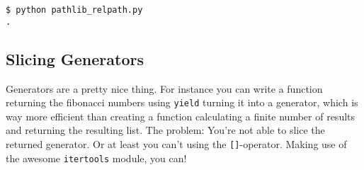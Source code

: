 \begin{lstlisting}[caption=Output of pathlib\_relpath.py]
$ python pathlib_relpath.py
.
\end{lstlisting}


\subsection{Slicing Generators}

Generators are a pretty nice thing.
For instance you can write a function returning the fibonacci numbers using \lstinline{yield} turning it into a generator, which is way more efficient than creating a function calculating a finite number of results and returning the resulting list.
The problem: You're not able to slice the returned generator.
Or at least you can't using the \lstinline{[]}-operator.
Making use of the awesome \lstinline{itertools} module, you can!


